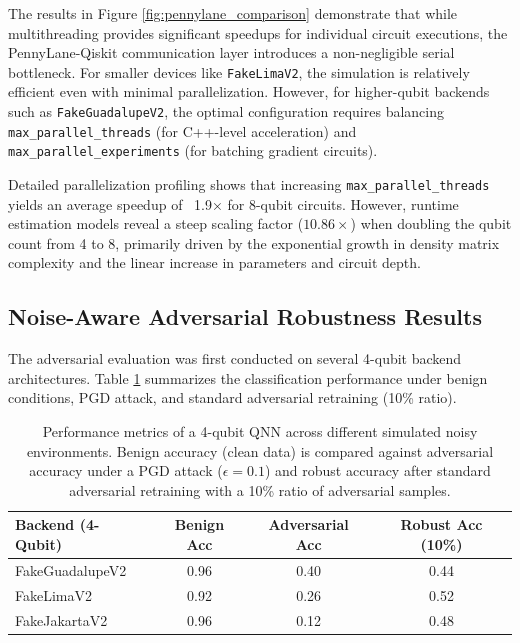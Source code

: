The results in Figure \ref{fig:pennylane_comparison} demonstrate that while multithreading provides significant speedups for individual circuit executions, the PennyLane-Qiskit communication layer introduces a non-negligible serial bottleneck. For smaller devices like \texttt{FakeLimaV2}, the simulation is relatively efficient even with minimal parallelization. However, for higher-qubit backends such as \texttt{FakeGuadalupeV2}, the optimal configuration requires balancing \texttt{max\_parallel\_threads} (for C++-level acceleration) and \texttt{max\_parallel\_experiments} (for batching gradient circuits).

Detailed parallelization profiling shows that increasing \texttt{max\_parallel\_threads} yields an average speedup of ~1.9× for 8-qubit circuits. However, runtime estimation models reveal a steep scaling factor ($10.86\times$) when doubling the qubit count from 4 to 8, primarily driven by the exponential growth in density matrix complexity and the linear increase in parameters and circuit depth.

\subsection{Noise-Aware Adversarial Robustness Results}

The adversarial evaluation was first conducted on several 4-qubit backend architectures. Table \ref{tab:results_fixed} summarizes the classification performance under benign conditions, PGD attack, and standard adversarial retraining (10\% ratio).

\begin{table}[h]
\centering
\begin{tabular}{lccc}
\toprule
\textbf{Backend (4-Qubit)} & \textbf{Benign Acc} & \textbf{Adversarial Acc} & \textbf{Robust Acc (10\%)} \\
\midrule
FakeGuadalupeV2 & 0.96 & 0.40 & 0.44 \\
FakeLimaV2      & 0.92 & 0.26 & 0.52 \\
FakeJakartaV2   & 0.96 & 0.12 & 0.48 \\
\bottomrule
\end{tabular}
    \caption{Performance metrics of a 4-qubit QNN across different simulated noisy environments. Benign accuracy (clean data) is compared against adversarial accuracy under a PGD attack ($\epsilon=0.1$) and robust accuracy after standard adversarial retraining with a 10\% ratio of adversarial samples.}
\label{tab:results_fixed}
\end{table}

